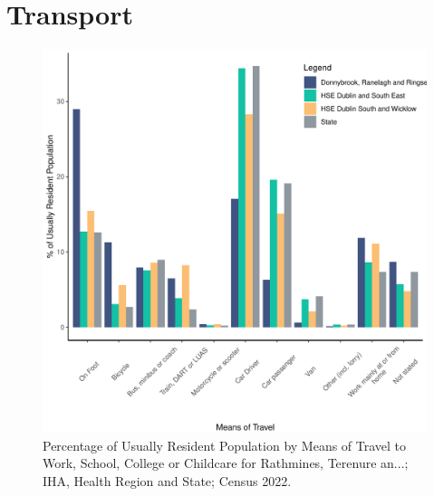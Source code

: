 \documentclass{article}
\begin{document}
\section{Transport}\label{sect:Trans}
\begin{figure}[H]
	\centering
	\includegraphics[width = 120mm]{../figures/TravelED.pdf}
	\caption{Percentage of Usually Resident Population by Means of Travel to Work, School, College or Childcare for Rathmines, Terenure an...; IHA, Health Region and State; Census 2022.}
	\label{fig:vbnv}
	\end{figure}
\end{document}
